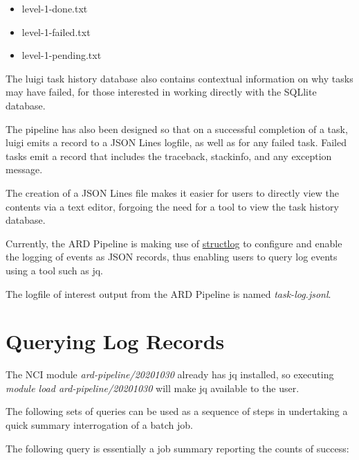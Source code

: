 \documentclass[a4paper,oneside,titlepage]{article}
\begin{document}
    \begin{itemize}
      \item level-1-done.txt
      \item level-1-failed.txt
      \item level-1-pending.txt
    \end{itemize}

    \begin{flushleft}
      The luigi task history database also contains contextual information on why tasks may have failed, for those interested in working directly with the SQLlite database. \par
      The pipeline has also been designed so that on a successful completion of a task, luigi emits a record to a JSON Lines logfile, as well as for any failed task. Failed tasks emit a record that includes the traceback, stackinfo, and any exception message. \par
      The creation of a JSON Lines file makes it easier for users to directly view the contents via a text editor, forgoing the need for a tool to view the task history database. \par
      Currently, the ARD Pipeline is making use of \href{https://www.structlog.org/en/stable/}{structlog} to configure and enable the logging of events as JSON records, thus enabling users to query log events using a tool such as jq. \par
      The logfile of interest output from the ARD Pipeline is named \textit{task-log.jsonl}.
    \end{flushleft}

  \section{Querying Log Records}

    \begin{flushleft}
      The NCI module \textit{ard-pipeline/20201030} already has jq installed, so executing \textit{module load ard-pipeline/20201030} will make jq available to the user. \par
      The following sets of queries can be used as a sequence of steps in undertaking a quick summary interrogation of a batch job.
    \end{flushleft}

    \begin{flushleft}
      The following query is essentially a job summary reporting the counts of success:
    \end{flushleft}
\end{document}
